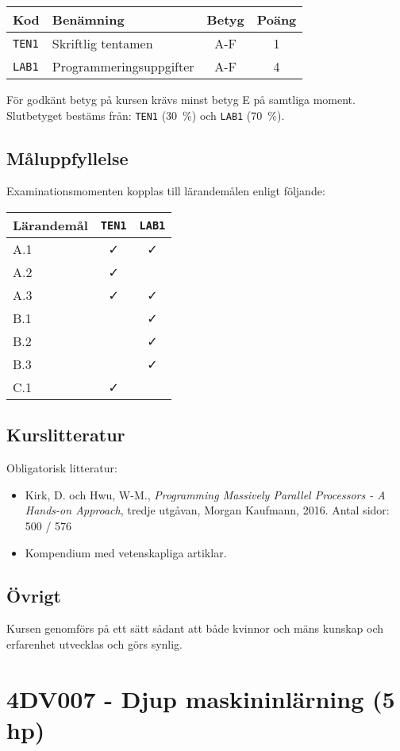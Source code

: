\begin{longtable}[]{@{}llcc@{}}
\toprule
\textsf{Kod} & \textsf{Benämning} & \textsf{Betyg} & \textsf{Poäng}\tabularnewline
\midrule
\endhead
\texttt{TEN1} & Skriftlig tentamen & A-F & 1\tabularnewline
\texttt{LAB1} & Programmeringsuppgifter & A-F & 4\tabularnewline
\bottomrule
\end{longtable}

För godkänt betyg på kursen krävs minst betyg E på samtliga moment.
Slutbetyget bestäms från: \texttt{TEN1} (30~\%) och \texttt{LAB1} (70~\%).

\subsection*{Måluppfyllelse}

Examinationsmomenten kopplas till lärandemålen enligt följande:

\begin{longtable}[]{@{}lcc@{}}
\toprule
\textsf{Lärandemål} & \texttt{TEN1} & \texttt{LAB1}\tabularnewline
\midrule
\endhead
A.1 & \faCheck & \faCheck\tabularnewline
A.2 & \faCheck &\tabularnewline
A.3 & \faCheck & \faCheck\tabularnewline
B.1 & & \faCheck\tabularnewline
B.2 & & \faCheck\tabularnewline
B.3 & & \faCheck\tabularnewline
C.1 & \faCheck &\tabularnewline
\bottomrule
\end{longtable}

\subsection*{Kurslitteratur}

Obligatorisk litteratur:

\begin{itemize}
\tightlist
\item
  Kirk, D. och Hwu, W-M., \emph{Programming Massively Parallel
  Processors - A Hands-on Approach}, tredje utgåvan, Morgan Kaufmann,
  2016. Antal sidor: 500 / 576
\item
  Kompendium med vetenskapliga artiklar.
\end{itemize}

\subsection*{Övrigt}

Kursen genomförs på ett sätt sådant att både kvinnor och mäns kunskap och erfarenhet utvecklas och görs synlig.
\pagebreak
\section*{4DV007 - Djup maskininlärning (5 hp)}

